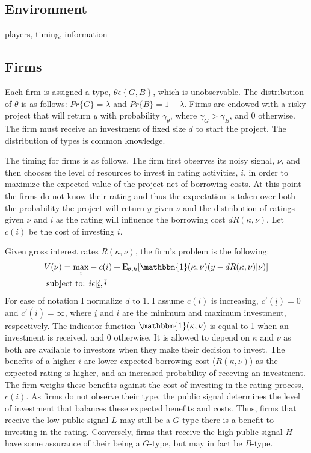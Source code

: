 \documentclass[titlepage]{article}
\begin{document}
\subsection{Environment}
players, timing, information

\subsection{Firms}
Each firm is assigned a type, $\theta \epsilon \left\{G,B\right\}$, which is unobservable. The distribution of $\theta$ is as follows: $Pr\{G\}=\lambda$ and $Pr\{B\}=1-\lambda$. Firms are endowed with a risky project that will return $y$ with probability $\gamma_{\theta}$, where $\gamma_{G}>\gamma_{B}$, and 0 otherwise. The firm must receive an investment of fixed size $d$ to start the project. The distribution of types is common knowledge. 

The timing for firms is as follows. The firm first observes its noisy signal, $\nu$, and then chooses the level of resources to invest in rating activities, $i$, in order to maximize the expected value of the project net of borrowing costs. At this point the firms do not know their rating and thus the expectation is taken over both the probability the project will return $y$ given $\nu$ and the distribution of ratings given $\nu$ and $i$ as the rating will influence the borrowing cost $dR(\kappa,\nu)$. Let $c(i)$ be the cost of investing $i$.

Given gross interest rates $R(\kappa,\nu)$, the firm's problem is the following:
\begin{align}
\label{eq:FP}V(\nu)=\max_{i} & -c(i)+\textup{E}_{\theta,h} [ \mathbbm{1}(\kappa,\nu) (y - dR(\kappa,\nu)|\nu ) ]\\
\textup{subject to: } & i\epsilon [\underline{i},\bar{i}] \nonumber
\end{align}
For ease of notation I normalize $d$ to 1. I assume $c(i)$ is increasing, $c'(\underline{i})=0$ and $c'(\bar{i})=\infty$, where $\underline{i}$ and $\bar{i}$ are the minimum and maximum investment, respectively. The indicator function $\mathbbm{1}(\kappa,\nu)$ is equal to 1 when an investment is received, and 0 otherwise. It is allowed to depend on $\kappa$ and $\nu$ as both are available to investors when they make their decision to invest. The benefits of a higher $i$ are lower expected borrowing cost ($R(\kappa,\nu)$) as the expected rating is higher, and an increased probability of receving an investment. The firm weighs these benefits against the cost of investing in the rating process, $c(i)$. As firms do not observe their type, the public signal determines the level of investment that balances these expected benefits and costs. Thus, firms that receive the low public signal $L$ may still be a $G$-type there is a benefit to investing in the rating. Conversely, firms that receive the high public signal $H$ have some assurance of their being a $G$-type, but may in fact be $B$-type. 
\end{document}
